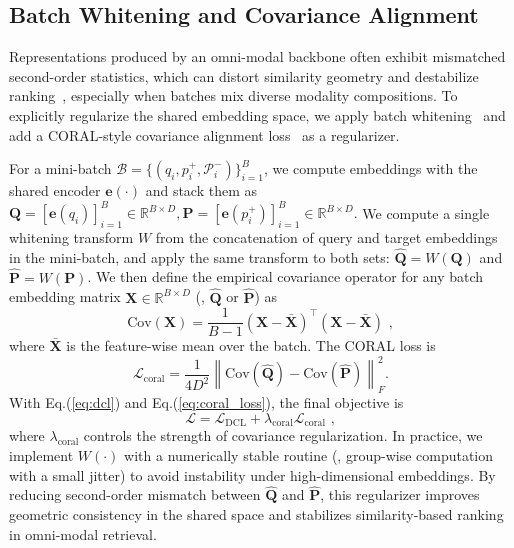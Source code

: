 \subsection{Batch Whitening and Covariance Alignment}
\label{subsec:method-align}

Representations produced by an omni-modal backbone often exhibit mismatched second-order statistics, which can distort similarity geometry and destabilize ranking~\cite{DBLP:journals/corr/abs-2103-15316}, especially when batches mix diverse modality compositions.
To explicitly regularize the shared embedding space, we apply batch whitening~\cite{Whiten} and add a CORAL-style covariance alignment loss~\cite{coral} as a regularizer.

For a mini-batch $\mathcal{B}=\{(q_i,p_i^{+},\mathcal{P}_i^{-})\}_{i=1}^{B}$, we compute embeddings with the shared encoder $\mathbf{e}(\cdot)$ and stack them as
$
\mathbf{Q}=[\mathbf{e}(q_i)]_{i=1}^{B}\in\mathbb{R}^{B\times D},
\mathbf{P}=[\mathbf{e}(p_i^{+})]_{i=1}^{B}\in\mathbb{R}^{B\times D}.
$
We compute a single whitening transform $W$ from the concatenation of query and target embeddings in the mini-batch, and apply the same transform to both sets:
$\widehat{\mathbf{Q}}=W(\mathbf{Q})$ and $\widehat{\mathbf{P}}=W(\mathbf{P})$.
We then define the empirical covariance operator for any batch embedding matrix $\mathbf{X}\in\mathbb{R}^{B\times D}$ (\eg, $\widehat{\mathbf{Q}}$ or $\widehat{\mathbf{P}}$) as
\begin{equation}
\mathrm{Cov}(\mathbf{X})=\frac{1}{B-1}(\mathbf{X}-\bar{\mathbf{X}})^{\top}(\mathbf{X}-\bar{\mathbf{X}})\,\,,
\label{eq:cov}
\end{equation}
where $\bar{\mathbf{X}}$ is the feature-wise mean over the batch.
The CORAL loss is
\begin{equation}
\mathcal{L}_{\mathrm{coral}}
=\frac{1}{4D^{2}}
\left\|
\mathrm{Cov}(\widehat{\mathbf{Q}})-\mathrm{Cov}(\widehat{\mathbf{P}})
\right\|_{F}^{2}.
\label{eq:coral_loss}
\end{equation}
With Eq.(\ref{eq:dcl}) and Eq.(\ref{eq:coral_loss}), the final objective is
\begin{equation}
\mathcal{L}
=\mathcal{L}_{\mathrm{DCL}}+\lambda_{\mathrm{coral}}\mathcal{L}_{\mathrm{coral}}\,\,,
\end{equation}
where $\lambda_{\mathrm{coral}}$ controls the strength of covariance regularization.
In practice, we implement $W(\cdot)$ with a numerically stable routine (\eg, group-wise computation with a small jitter) to avoid instability under high-dimensional embeddings.
By reducing second-order mismatch between $\widehat{\mathbf{Q}}$ and $\widehat{\mathbf{P}}$, this regularizer improves geometric consistency in the shared space and stabilizes similarity-based ranking in omni-modal retrieval.




